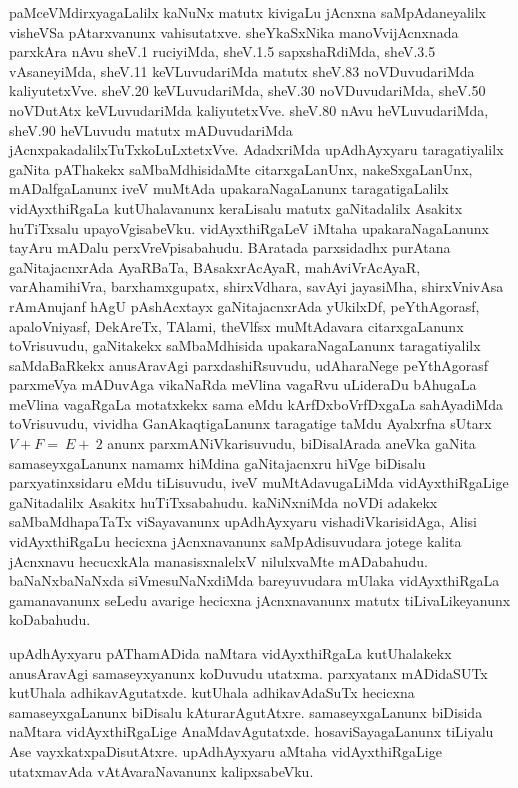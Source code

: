 paMceVMdirxyagaLalilx kaNuNx matutx kivigaLu jAcnxna saMpAdaneyalilx visheVSa \-pAtarxvanunx vahisutatxve. sheYkaSxNika manoVvijAcnxnada parxkAra nAvu sheV.{\rm 1} ruciyiMda, sheV.{\rm 1.5} sapxshaR\-diMda, sheV.{\rm 3.5} vAsaneyiMda, sheV.{\rm 11} keVLuvudariMda matutx sheV.{\rm 83} noVDuvudariMda kaliyutetxVve. sheV.{\rm 20} keVLuvudariMda, sheV.{\rm 30} noVDuvudariMda, sheV.{\rm 50} noVDutAtx keVLuvudariMda kaliyutetxVve. sheV.{\rm 80} nAvu heVLuvudariMda, sheV.{\rm 90} heVLuvudu matutx mADuvudariMda jAcnxpakadalilxTuTxkoLuLxtetxVve. AdadxriMda upAdhAyxyaru taragatiyalilx gaNita pAThakekx saMbaMdhisidaMte citarxgaLanUnx, nakeSxgaLanUnx, mADalfgaLanunx iveV muMtAda upakaraNagaLanunx taragatigaLalilx vidAyxthiRgaLa kutUhalavanunx keraLisalu matutx gaNitadalilx Asakitx huTiTxsalu upayoVgisabeVku. vidAyxthiRgaLeV iMtaha upa\-karaNagaLanunx tayAru mADalu perxVreVpisabahudu. BAratada parxsidadhx purAtana gaNitajacnxrAda AyaRBaTa, BAsakxrAcAyaR, mahAviVrAcAyaR, varAhamihiVra, barxhamxgupatx, shirxVdhara, savAyi jayasiMha, shirxVnivAsa rAmAnujanf hAgU pAshAcxtayx gaNitajacnxrAda yUkilxDf, peYthAgorasf, apaloVniyasf, DekAreTx, TAlami, theVlfsx muMtAdavara citarxgaLanunx toVrisuvudu, gaNitakekx saMbaMdhisida upakaraNagaLanunx taragatiyalilx saMdaBaRkekx anusAravAgi parxdashiRsuvudu, udAharaNege peYthAgorasf parxmeVya mADuvAga vikaNaRda meVlina vagaRvu uLideraDu bAhugaLa meVlina vagaRgaLa motatxkekx sama eMdu kArfDxboVrfDxgaLa sahAyadiMda toVrisuvudu, vividha GanAkaqtigaLanunx taragatige taMdu Ayalxrfna sUtarx $V+F=~E+~2$ anunx parxmANiVkarisuvudu, biDisalArada aneVka gaNita samaseyxgaLanunx namamx hiMdina gaNitajacnxru hiVge biDisalu parxyatinxsidaru eMdu tiLisuvudu, iveV muMtAdavugaLiMda vidAyxthiRgaLige gaNitadalilx Asakitx huTiTxsabahudu. kaNiNxniMda noVDi adakekx saMbaMdha\-paTaTx viSayavanunx upAdhAyxyaru vishadiVkarisidAga, Alisi vidAyxthiRgaLu hecicxna jAcnxnavanunx saMpAdisuvudara jotege kalita jAcnxnavu hecucxkAla manasisxnalelxV nilulxvaMte mADabahudu. baNaNxbaNaNxda siVmesuNaNxdiMda bareyuvudara mUlaka vidAyxthiRgaLa gamanavanunx seLedu avarige hecicxna jAcnxnavanunx matutx tiLivaLikeyanunx koDabahudu.

upAdhAyxyaru pAThamADida naMtara vidAyxthiRgaLa kutUhalakekx anusAravAgi samaseyxyanunx koDuvudu utatxma. parxyatanx mADidaSUTx kutUhala adhikavAgutatxde. kutUhala adhikavAdaSuTx hecicxna samaseyxgaLanunx biDisalu kAturarAgutAtxre. samaseyx\-gaLanunx biDisida naMtara vidAyxthiRgaLige AnaMdavAgutatxde. hosaviSayagaLanunx tiLiyalu Ase vayxkatxpaDisutAtxre. upAdhAyxyaru aMtaha vidAyxthiRgaLige utatxmavAda vAtAvaraNavanunx kalipxsabeVku.

